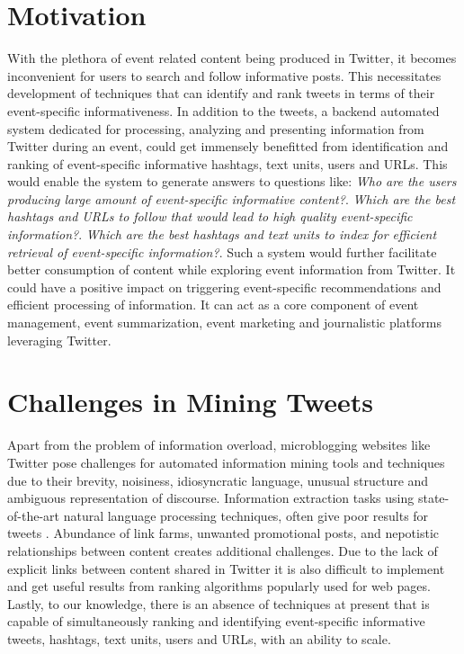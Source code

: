 \section{Motivation} 
With the plethora of event related content being produced in Twitter, it becomes inconvenient for users to search and follow informative posts. This necessitates development of techniques that can identify and rank tweets in terms of their event-specific informativeness. In addition to the tweets, a backend automated system dedicated for processing, analyzing and presenting information from Twitter during an event, could get immensely benefitted from identification and ranking of event-specific informative hashtags, text units, users and URLs. This would enable the system to generate answers to questions like: \textit{Who are the users producing large amount of event-specific informative content?}. \textit{Which are the best hashtags and URLs to follow that would lead to high quality event-specific information?}. \textit{Which are the best hashtags and text units to index for efficient retrieval of event-specific information?}. Such a system would further facilitate better consumption of content while exploring event information from Twitter. It could have a positive impact on triggering event-specific recommendations and efficient processing of information. It can act as a core component of event management, event summarization, event marketing and journalistic platforms leveraging Twitter.


\section{Challenges in Mining Tweets} 
Apart from the problem of information overload, microblogging websites like Twitter pose challenges for automated information mining tools and techniques due to their brevity, noisiness, idiosyncratic language, unusual structure and ambiguous representation of discourse. Information extraction tasks using state-of-the-art natural language processing techniques, often give poor results for tweets \cite{ritter2011named}. Abundance of link farms, unwanted promotional posts, and nepotistic relationships between content creates additional challenges. Due to the lack of explicit links between content shared in Twitter it is also difficult to implement and get useful results from ranking algorithms popularly used for web pages. Lastly, to our knowledge, there is an absence of techniques at present that is capable of simultaneously ranking and identifying event-specific informative tweets, hashtags, text units, users and URLs, with an ability to scale. 

